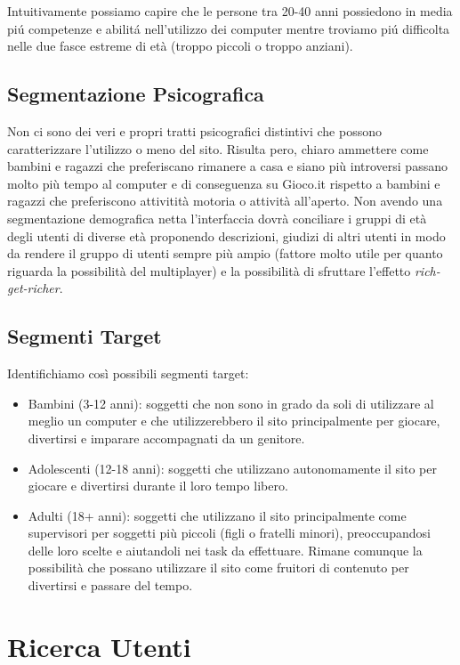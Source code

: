 \documentclass[../Report.tex]{subfiles}
\begin{document}
    Intuitivamente possiamo capire che le persone tra 20-40 anni possiedono in media piú competenze e abilitá nell’utilizzo dei computer mentre troviamo piú difficolta nelle due fasce estreme di età (troppo piccoli o troppo anziani).
    
    \subsection{Segmentazione Psicografica}

    Non ci sono dei veri e propri tratti psicografici distintivi che possono caratterizzare l'utilizzo o meno del sito. Risulta pero, chiaro ammettere come bambini e ragazzi che preferiscano rimanere a casa e siano più introversi passano molto più tempo al computer e di conseguenza su Gioco.it rispetto a bambini e ragazzi che preferiscono attivitità motoria o attività all'aperto. 
    Non avendo una segmentazione demografica netta l’interfaccia dovrà conciliare i gruppi di età degli utenti di diverse età proponendo descrizioni, giudizi di altri utenti in modo da rendere il gruppo di utenti sempre più ampio (fattore molto utile per quanto riguarda la possibilità del multiplayer) e la possibilità di sfruttare l'effetto \emph{rich-get-richer}.

    \subsection{Segmenti Target}
    Identifichiamo così possibili segmenti target:
    \begin{itemize}
        \item Bambini (3-12 anni): soggetti che non sono in grado da soli di utilizzare al meglio un computer e che utilizzerebbero il sito principalmente per giocare, divertirsi e imparare accompagnati da un genitore.
        \item Adolescenti (12-18 anni): soggetti che utilizzano autonomamente il sito per giocare e divertirsi durante il loro tempo libero. 
        \item Adulti (18+ anni): soggetti che utilizzano il sito principalmente come supervisori per soggetti più piccoli (figli o fratelli minori), preoccupandosi delle loro scelte e aiutandoli nei task da effettuare. Rimane comunque la possibilità che possano utilizzare il sito come fruitori di contenuto per divertirsi e passare del tempo.       
    \end{itemize}

    \section{Ricerca Utenti}
    
\end{document}
